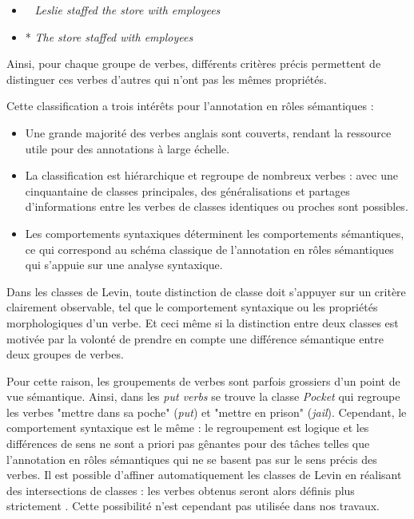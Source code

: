 \begin{itemize}
    \item ~ \emph{Leslie staffed the store with employees}
    \item * \emph{The store staffed with employees}
\end{itemize}

Ainsi, pour chaque groupe de verbes, différents critères précis permettent de
distinguer ces verbes d'autres qui n'ont pas les mêmes propriétés.

Cette classification a trois intérêts pour l'annotation en rôles sémantiques :

\begin{itemize}

    \item Une grande majorité des verbes anglais sont couverts, rendant la
        ressource utile pour des annotations à large échelle.

    \item La classification est hiérarchique et regroupe de nombreux verbes :
        avec une cinquantaine de classes principales, des généralisations et
        partages d'informations entre les verbes de classes identiques ou
        proches sont possibles.

    \item Les comportements syntaxiques déterminent les comportements
        sémantiques, ce qui correspond au schéma classique de l'annotation en
        rôles sémantiques qui s'appuie sur une analyse syntaxique.

\end{itemize}



Dans les classes de Levin, toute distinction de classe doit s'appuyer sur un
critère clairement observable, tel que le comportement syntaxique ou les
propriétés morphologiques d'un verbe. Et ceci même si la distinction entre deux
classes est motivée par la volonté de prendre en compte une différence
sémantique entre deux groupes de verbes.

Pour cette raison, les groupements de verbes sont parfois grossiers d'un point
de vue sémantique. Ainsi, dans les \textit{put verbs} se trouve la classe
\textit{Pocket} qui regroupe les verbes "mettre dans sa poche" (\emph{put}) et
"mettre en prison" (\emph{jail}). Cependant, le comportement syntaxique est le
même : le regroupement est logique et les différences de sens ne sont a priori
pas gênantes pour des tâches telles que l'annotation en rôles sémantiques qui
ne se basent pas sur le sens précis des verbes. Il est possible d'affiner
automatiquement les classes de Levin en réalisant des intersections de classes
: les verbes obtenus seront alors définis plus strictement
\citep{dang1998investigating}. Cette possibilité n'est cependant pas utilisée
dans nos travaux.

